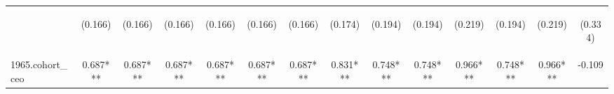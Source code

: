 \begin{center}
\begin{tabular}{lccccccccccccc}
\vspace{4pt} & \begin{footnotesize}(0.166)\end{footnotesize} & \begin{footnotesize}(0.166)\end{footnotesize} & \begin{footnotesize}(0.166)\end{footnotesize} & \begin{footnotesize}(0.166)\end{footnotesize} & \begin{footnotesize}(0.166)\end{footnotesize} & \begin{footnotesize}(0.166)\end{footnotesize} & \begin{footnotesize}(0.174)\end{footnotesize} & \begin{footnotesize}(0.194)\end{footnotesize} & \begin{footnotesize}(0.194)\end{footnotesize} & \begin{footnotesize}(0.219)\end{footnotesize} & \begin{footnotesize}(0.194)\end{footnotesize} & \begin{footnotesize}(0.219)\end{footnotesize} & \begin{footnotesize}(0.334)\end{footnotesize} \\
1965.cohort\_ceo & 0.687*** & 0.687*** & 0.687*** & 0.687*** & 0.687*** & 0.687*** & 0.831*** & 0.748*** & 0.748*** & 0.966*** & 0.748*** & 0.966*** & -0.109 \\

\end{tabular}
\end{center}
